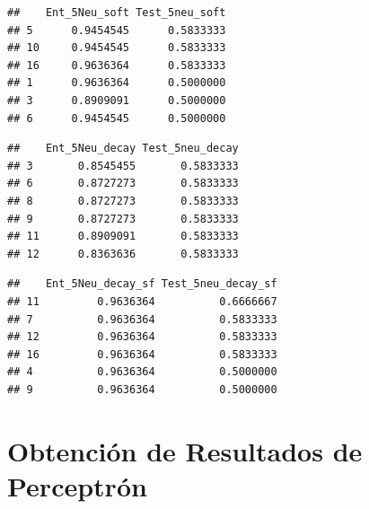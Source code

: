 \documentclass[]{article}
\newenvironment{Shaded}{\begin{snugshade}}{\end{snugshade}}
\newcommand{\KeywordTok}[1]{\textcolor[rgb]{0.13,0.29,0.53}{\textbf{#1}}}
\newcommand{\DataTypeTok}[1]{\textcolor[rgb]{0.13,0.29,0.53}{#1}}
\newcommand{\DecValTok}[1]{\textcolor[rgb]{0.00,0.00,0.81}{#1}}
\newcommand{\OperatorTok}[1]{\textcolor[rgb]{0.81,0.36,0.00}{\textbf{#1}}}
\newcommand{\NormalTok}[1]{#1}
\begin{document}
\begin{verbatim}
##    Ent_5Neu_soft Test_5neu_soft
## 5      0.9454545      0.5833333
## 10     0.9454545      0.5833333
## 16     0.9636364      0.5833333
## 1      0.9636364      0.5000000
## 3      0.8909091      0.5000000
## 6      0.9454545      0.5000000
\end{verbatim}

\begin{Shaded}
\end{Shaded}

\begin{verbatim}
##    Ent_5Neu_decay Test_5neu_decay
## 3       0.8545455       0.5833333
## 6       0.8727273       0.5833333
## 8       0.8727273       0.5833333
## 9       0.8727273       0.5833333
## 11      0.8909091       0.5833333
## 12      0.8363636       0.5833333
\end{verbatim}

\begin{Shaded}
\end{Shaded}

\begin{verbatim}
##    Ent_5Neu_decay_sf Test_5neu_decay_sf
## 11         0.9636364          0.6666667
## 7          0.9636364          0.5833333
## 12         0.9636364          0.5833333
## 16         0.9636364          0.5833333
## 4          0.9636364          0.5000000
## 9          0.9636364          0.5000000
\end{verbatim}

\section{Obtención de Resultados de
Perceptrón}\label{obtencion-de-resultados-de-perceptron}
\end{document}

